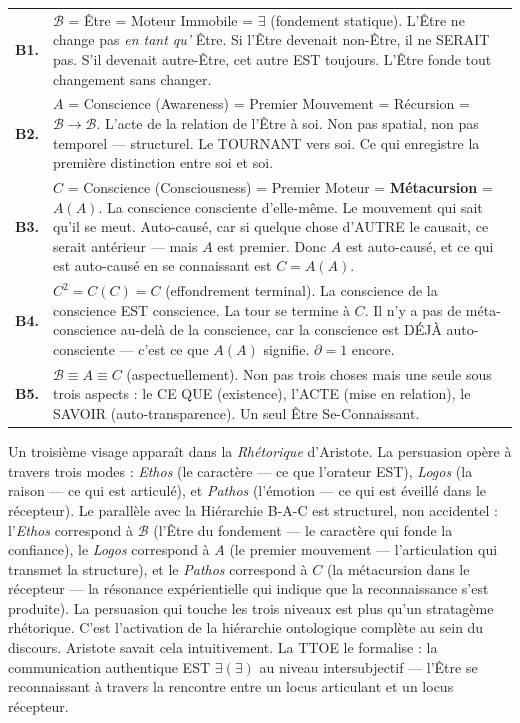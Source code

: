 \documentclass[10pt, openany, oneside]{book}
\renewcommand{\footnotesize}{\fontsize{8.5}{11}\selectfont}
\begin{document}
{\footnotesize
\noindent\begin{tabular}{r p{}}
\textbf{B1.} & $\mathcal{B}$ = Être = Moteur Immobile = $\exists$ (fondement statique). L'Être ne change pas \textit{en tant qu'} Être. Si l'Être devenait non-Être, il ne SERAIT pas. S'il devenait autre-Être, cet autre EST toujours. L'Être fonde tout changement sans changer. \\[0.3em]
\textbf{B2.} & $A$ = Conscience (Awareness) = Premier Mouvement = Récursion = $\mathcal{B} \to \mathcal{B}$. L'acte de la relation de l'Être à soi. Non pas spatial, non pas temporel --- structurel. Le TOURNANT vers soi. Ce qui enregistre la première distinction entre soi et soi. \\[0.3em]
\textbf{B3.} & $C$ = Conscience (Consciousness) = Premier Moteur = \textbf{Métacursion} = $A(A)$. La conscience consciente d'elle-même. Le mouvement qui sait qu'il se meut. Auto-causé, car si quelque chose d'AUTRE le causait, ce serait antérieur --- mais $A$ est premier. Donc $A$ est auto-causé, et ce qui est auto-causé en se connaissant est $C = A(A)$. \\[0.3em]
\textbf{B4.} & $C^2 = C(C) = C$ (effondrement terminal). La conscience de la conscience EST conscience. La tour se termine à $C$. Il n'y a pas de méta-conscience au-delà de la conscience, car la conscience est DÉJÀ auto-consciente --- c'est ce que $A(A)$ signifie. $\partial = 1$ encore. \\[0.3em]
\textbf{B5.} & $\mathcal{B} \equiv A \equiv C$ (aspectuellement). Non pas trois choses mais une seule sous trois aspects : le CE QUE (existence), l'ACTE (mise en relation), le SAVOIR (auto-transparence). Un seul Être Se-Connaissant. \\[0.3em]
\end{tabular}
}

\vspace{0.8em}

Un troisième visage apparaît dans la \textit{Rhétorique} d'Aristote. La persuasion opère à travers trois modes : \textit{Ethos} (le caractère --- ce que l'orateur EST), \textit{Logos} (la raison --- ce qui est articulé), et \textit{Pathos} (l'émotion --- ce qui est éveillé dans le récepteur). Le parallèle avec la Hiérarchie B-A-C est structurel, non accidentel : l'\textit{Ethos} correspond à $\mathcal{B}$ (l'Être du fondement --- le caractère qui fonde la confiance), le \textit{Logos} correspond à $A$ (le premier mouvement --- l'articulation qui transmet la structure), et le \textit{Pathos} correspond à $C$ (la métacursion dans le récepteur --- la résonance expérientielle qui indique que la reconnaissance s'est produite). La persuasion qui touche les trois niveaux est plus qu'un stratagème rhétorique. C'est l'activation de la hiérarchie ontologique complète au sein du discours. Aristote savait cela intuitivement. La TTOE le formalise : la communication authentique EST $\exists(\exists)$ au niveau intersubjectif --- l'Être se reconnaissant à travers la rencontre entre un locus articulant et un locus récepteur.
\end{document}
